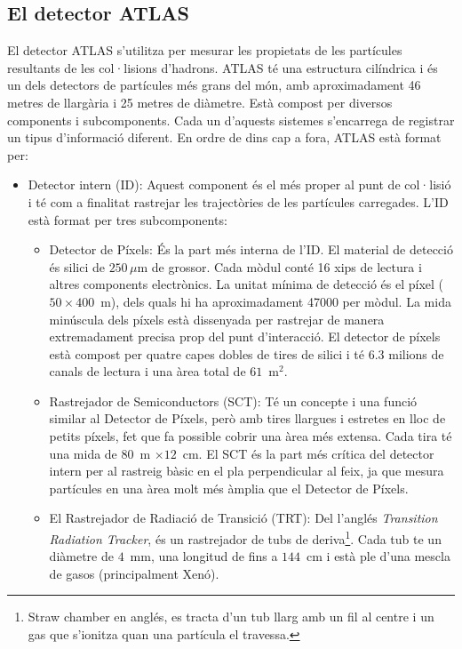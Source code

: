 \subsection{El detector ATLAS}
\label{chap:resumen_val:Exp:ATLAS}
El detector ATLAS s'utilitza per mesurar les propietats de les partícules resultants de les col·lisions d'hadrons. 
ATLAS té una estructura cilíndrica i és un dels detectors de partícules més grans del món, amb aproximadament 
46 metres de llargària i 25 metres de diàmetre. Està compost per diversos components i subcomponents. 
Cada un d'aquests sistemes s'encarrega de registrar un tipus d'informació diferent. En ordre de dins cap a fora, 
ATLAS està format per:
\begin{itemize}
\item Detector intern (ID): Aquest component és el més proper al punt de col·lisió i té com a finalitat 
	rastrejar les trajectòries de les partícules carregades. L'ID està format per tres subcomponents:
	\begin{itemize}
	\item Detector de Píxels: És la part més interna de l'ID. El material de detecció és silici de $250\,\mu$m 
		de grossor. Cada mòdul conté 16 xips de lectura i altres components electrònics. La unitat mínima 
		de detecció és el píxel ($50\times400$~\textmu m), dels quals hi ha aproximadament 47000 per mòdul.
		La mida minúscula dels píxels està dissenyada per rastrejar de manera extremadament precisa prop del 
		punt d'interacció. El detector de píxels està compost per quatre capes dobles de tires de silici i té 6.3 milions de canals de 
		lectura i una àrea total de $61$~m$^{2}$.
		
	\item Rastrejador de Semiconductors (SCT):  Té un concepte i una funció similar al Detector de Píxels, 
		però amb tires llargues i estretes en lloc de petits píxels, fet que fa possible cobrir una àrea més extensa.
		Cada tira té una mida de $80$~\textmu m  $\times 12$~cm. El SCT és la part més crítica del detector intern per al 
		rastreig bàsic en el pla perpendicular al feix, ja que mesura partícules en una àrea molt més àmplia que el 
		Detector de Píxels.
		
	\item El Rastrejador de Radiació de Transició (TRT): Del l'anglés \textit{Transition Radiation Tracker}, és un 
		rastrejador de tubs de deriva\footnote{Straw chamber en anglés, es tracta d'un tub llarg amb un fil al centre i un
		gas que s'ionitza quan una partícula el travessa.}. Cada tub te un diàmetre 
		de $4$~mm, una longitud de fins a $144$~cm i està ple d'una mescla de gasos (principalment Xenó).
	\end{itemize}
	

\end{itemize}

